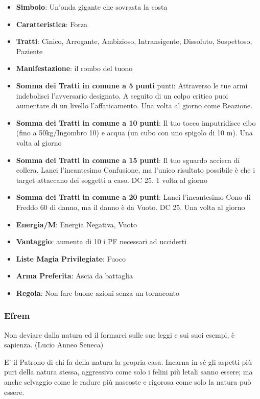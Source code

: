 \begin{multicols}{2}
\begin{itemize}[leftmargin=*] \setlength{\itemsep}{0pt}
\item \textbf{Simbolo}: Un'onda gigante che sovrasta la costa
\item \textbf{Caratteristica}: Forza
\item \textbf{Tratti}: Cinico, Arrogante, Ambizioso, Intransigente, Dissoluto, Sospettoso, Paziente
\item \textbf{Manifestazione}: il rombo del tuono
\item \textbf{Somma dei Tratti in comune a 5 punti} punti: Attraverso le tue armi indebolisci l'avversario designato. A seguito di un colpo critico puoi aumentare di un livello l'affaticamento. Una volta al giorno come Reazione.
\item \textbf{Somma dei Tratti in comune a 10 punti}: Il tuo tocco imputridisce cibo (fino a 50kg/Ingombro 10) e acqua (un cubo con uno spigolo di 10 m). Una volta al giorno
\item \textbf{Somma dei Tratti in comune a 15 punti}: Il tuo sguardo accieca di collera. Lanci l'incantesimo Confusione, ma l'unico risultato possibile è che i target attaccano dei soggetti a caso. DC 25. 1 volta al giorno
\item \textbf{Somma dei Tratti in comune a 20 punti}: Lanci l'incantesimo Cono di Freddo 60 di danno, ma il danno è da Vuoto. DC 25. Una volta al giorno
\item \textbf{Energia/M}: Energia Negativa, Vuoto
\item \textbf{Vantaggio}: aumenta di 10 i PF necessari ad ucciderti
\item \textbf{Liste Magia Privilegiate}: Fuoco
\item \textbf{Arma Preferita}: Ascia da battaglia
\item \textbf{Regola}: Non fare buone azioni senza un tornaconto
\end{itemize}

\subsubsection{Efrem}\label{efrem}\hypertarget{efrem}{}

\begin{enfasi}{
Non deviare dalla natura ed il formarci sulle sue leggi e sui suoi esempi, è sapienza. (Lucio Anneo Seneca)
}\end{enfasi}

E' il Patrono di chi fa della natura la propria casa. Incarna in sé gli aspetti più puri della natura stessa, aggressivo come solo i felini più letali sanno essere; ma anche selvaggio come le radure più nascoste e rigorosa come solo la natura può essere.


\end{multicols}
